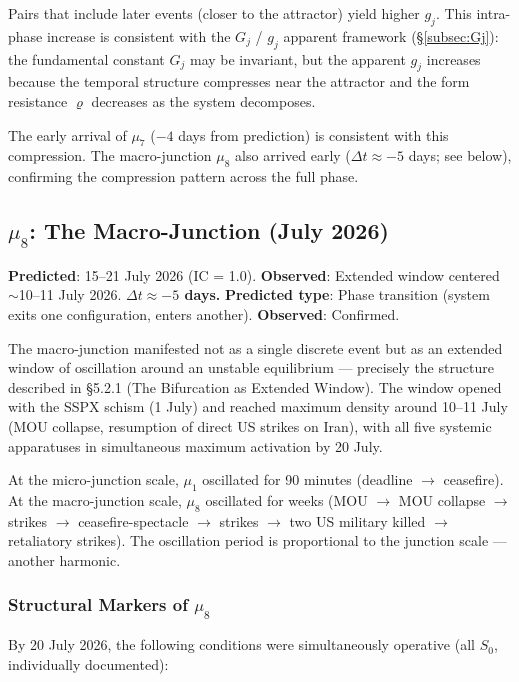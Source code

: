 \documentclass[12pt,a4paper]{article}
\newcommand{\gj}{g_j}
\begin{document}
Pairs that include later events (closer to the attractor) yield higher $\gj$. This intra-phase increase is consistent with the $G_j$ / $\gj$ apparent framework (\S\ref{subsec:Gj}): the fundamental constant $G_j$ may be invariant, but the apparent $\gj$ increases because the temporal structure compresses near the attractor and the form resistance $\varrho$ decreases as the system decomposes.

The early arrival of $\mu_7$ ($-4$ days from prediction) is consistent with this compression. The macro-junction $\mu_8$ also arrived early ($\Delta t \approx -5$ days; see below), confirming the compression pattern across the full phase.


\subsection{$\mu_8$: The Macro-Junction (July 2026)}\label{subsec:mu8}

\textbf{Predicted}: 15--21 July 2026 (IC = 1.0). \textbf{Observed}: Extended window centered $\sim$10--11 July 2026. \textbf{$\Delta t \approx -5$ days.} \textbf{Predicted type}: Phase transition (system exits one configuration, enters another). \textbf{Observed}: Confirmed.

The macro-junction manifested not as a single discrete event but as an extended window of oscillation around an unstable equilibrium --- precisely the structure described in \S5.2.1 (The Bifurcation as Extended Window). The window opened with the SSPX schism (1 July) and reached maximum density around 10--11 July (MOU collapse, resumption of direct US strikes on Iran), with all five systemic apparatuses in simultaneous maximum activation by 20 July.

At the micro-junction scale, $\mu_1$ oscillated for 90 minutes (deadline $\to$ ceasefire). At the macro-junction scale, $\mu_8$ oscillated for weeks (MOU $\to$ MOU collapse $\to$ strikes $\to$ ceasefire-spectacle $\to$ strikes $\to$ two US military killed $\to$ retaliatory strikes). The oscillation period is proportional to the junction scale --- another harmonic.

\subsubsection{Structural Markers of $\mu_8$}

By 20 July 2026, the following conditions were simultaneously operative (all $S_0$, individually documented):
\end{document}
